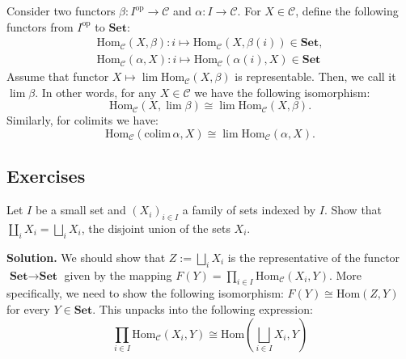 \documentclass{category-template}
\begin{document}
\begin{definition}[Limits]
    Consider two functors $\beta: I^{\text{op}} \to \mathcal{C}$ and 
    $\alpha: I \to \mathcal{C}$. For $X \in \mathcal{C}$, define the 
    following functors from $I^{\text{op}}$ to $\textbf{Set}$:
    \begin{gather*}
        \text{Hom}_{\mathcal{C}}(X,\beta): i \mapsto \text{Hom}_{\mathcal{C}}(X,\beta(i)) \in \textbf{Set}, \\
        \text{Hom}_{\mathcal{C}}(\alpha,X): i \mapsto \text{Hom}_{\mathcal{C}}(\alpha(i),X) \in \textbf{Set}
    \end{gather*}
    Assume that functor $X \mapsto \lim \text{Hom}_{\mathcal{C}}(X,\beta)$ is representable. Then, 
    we call it $\lim\beta$. In other words, for any $X \in \mathcal{C}$ we have the following isomorphism:
    \begin{equation*}
        \text{Hom}_{\mathcal{C}}(X, \lim\beta) \cong \lim \text{Hom}_{\mathcal{C}}(X,\beta).
    \end{equation*}
    Similarly, for colimits we have:
    \begin{equation*}
        \text{Hom}_{\mathcal{C}}(\text{colim}\,\alpha,X) \cong \lim\text{Hom}_{\mathcal{C}}(\alpha,X).
    \end{equation*}
\end{definition}

\subsection{Exercises}

\begin{problem}
    Let $I$ be a small set and $(X_i)_{i \in I}$ a family of sets 
    indexed by $I$. Show that $\coprod_i X_i = \bigsqcup_i X_i$, the disjoint 
    union of the sets $X_i$.
\end{problem}

\textbf{Solution.} We should show that $Z := \bigsqcup_i X_i$ is the
representative of the functor $\textbf{Set} \to \textbf{Set}$ given by the
mapping $F(Y) = \prod_{i \in I}\text{Hom}_{\mathcal{C}}(X_i, Y)$. More
specifically, we need to show the following isomorphism: $F(Y) \cong
\text{Hom}(Z, Y)$ for every $Y \in \textbf{Set}$. This unpacks into the 
following expression:
\begin{equation*}
    \prod_{i \in I}\text{Hom}_{\mathcal{C}}(X_i, Y) \cong \text{Hom}\left(\bigsqcup_{i \in I} X_i, Y\right)
\end{equation*}
\end{document}
